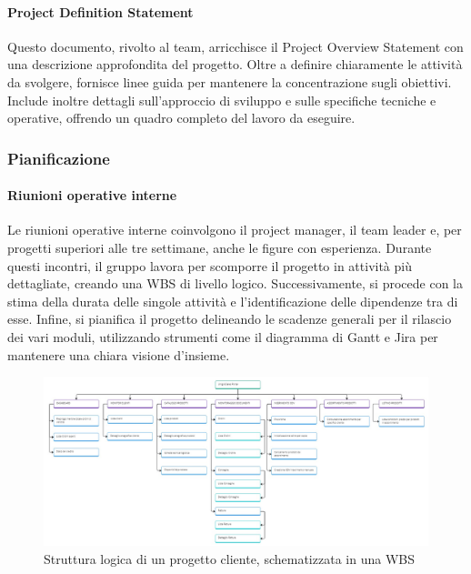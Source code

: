             \paragraph{Project Definition Statement}
            Questo documento, rivolto al team, arricchisce il Project Overview Statement con una descrizione approfondita
            del progetto. Oltre a definire chiaramente le attività da svolgere, fornisce linee guida per mantenere la concentrazione
            sugli obiettivi. Include inoltre dettagli sull’approccio di sviluppo e sulle specifiche tecniche e operative, offrendo
            un quadro completo del lavoro da eseguire.

        \subsubsection{Pianificazione}
            \paragraph{Riunioni operative interne}
            Le riunioni operative interne coinvolgono il project manager, il team leader e, per progetti superiori alle tre
            settimane, anche le figure con esperienza. Durante questi incontri, il gruppo lavora per scomporre il
            progetto in attività più dettagliate, creando una \ac{WBS} di livello logico. Successivamente,
            si procede con la stima della durata delle singole attività e l’identificazione delle dipendenze tra di esse.
            Infine, si pianifica il progetto delineando le scadenze generali per il
            rilascio dei vari moduli, utilizzando strumenti come il diagramma di Gantt e Jira per mantenere una chiara visione d’insieme.
            
            \begin{figure}
                \centering
                \includegraphics[width=\linewidth]{figures/ProgettoClienteWBS.jpg}
                \caption{Struttura logica di un progetto cliente, schematizzata in una \ac{WBS}}
                \label{fig:wbs-nuovo}
            \end{figure}
